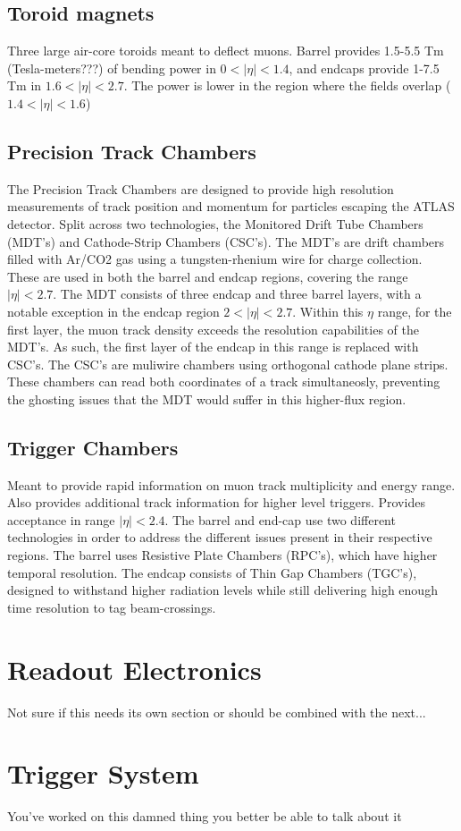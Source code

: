     \subsection{Toroid magnets}
        Three large air-core toroids meant to deflect muons.
        Barrel provides 1.5-5.5 Tm (Tesla-meters???) of bending power in $0<|\eta|<1.4$,
        and endcaps provide 1-7.5 Tm in $1.6<|\eta|<2.7$.
        The power is lower in the region where the fields overlap ($1.4<|\eta|<1.6$)

    \subsection{Precision Track Chambers}
        The Precision Track Chambers are designed to provide high resolution measurements of track position and momentum for particles escaping the ATLAS detector. Split across two technologies, the Monitored Drift Tube Chambers (MDT's) and Cathode-Strip Chambers (CSC's).
        The MDT's are drift chambers filled with Ar/CO2 gas using a tungsten-rhenium wire for charge collection. These are used in both the barrel and endcap regions, covering the range $|\eta| < 2.7$. The MDT consists of three endcap and three barrel layers, with a notable exception in the endcap region $2 < |\eta| < 2.7$. Within this $\eta$ range, for the first layer, the muon track density exceeds the resolution capabilities of the MDT's. As such, the first layer of the endcap in this range is replaced with CSC's. The CSC's are muliwire chambers using orthogonal cathode plane strips. These chambers can read both coordinates of a track simultaneosly, preventing the ghosting issues that the MDT would suffer in this higher-flux region.

    \subsection{Trigger Chambers}
        Meant to provide rapid information on muon track multiplicity and energy range.
        Also provides additional track information for higher level triggers.
        Provides acceptance in range $|\eta| < 2.4$.
        The barrel and end-cap use two different technologies in order to address the different issues present in their respective regions.
        The barrel uses Resistive Plate Chambers (RPC's), which have higher temporal resolution. The endcap consists of Thin Gap Chambers (TGC's), designed to withstand higher radiation levels while still delivering high enough time resolution to tag beam-crossings.




\section{Readout Electronics}
    Not sure if this needs its own section or should be combined with the next...

\section{Trigger System}
    You've worked on this damned thing you better be able to talk about it
